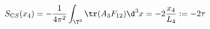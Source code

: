 \begin{equation}
\label{CS-1}
S_{\mathrm CS} (x_4) = 
- \frac{1}{4 \pi^2} \int_{\T^3} \tr ( A_3 F_{12} ) \d^3 x =
- 2 \frac{x_4}{L_4} := - 2 \tau \, 
\end{equation}

